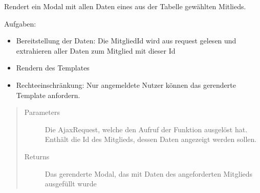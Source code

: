 \documentclass[letterpaper,10pt,english]{sphinxmanual}
\begin{document}

\begin{fulllineitems}
\label{\detokenize{masterCodeDoc:mitglieder.views.mitglied_laden}}
Rendert ein Modal mit allen Daten eines aus der Tabelle gewählten Mitlieds.

Aufgaben:
\begin{itemize}
\item {} 
Bereitstellung der Daten: Die Mitglied\sphinxhyphen{}Id wird aus request gelesen und extrahieren aller Daten zum Mitglied mit dieser Id

\item {} 
Rendern des Templates

\item {} 
Rechteeinschränkung: Nur angemeldete Nutzer können das gerenderte Template anfordern.

\end{itemize}
\begin{quote}\begin{description}
\item[{Parameters}] \leavevmode
{} \textendash{} Die Ajax\sphinxhyphen{}Request, welche den Aufruf der Funktion ausgelöst hat. Enthält die Id des Mitglieds, dessen Daten angezeigt werden sollen.

\item[{Returns}] \leavevmode
Das gerenderte Modal, das mit Daten des angeforderten Mitglieds ausgefüllt wurde

\end{description}\end{quote}

\end{fulllineitems}

\end{document}

